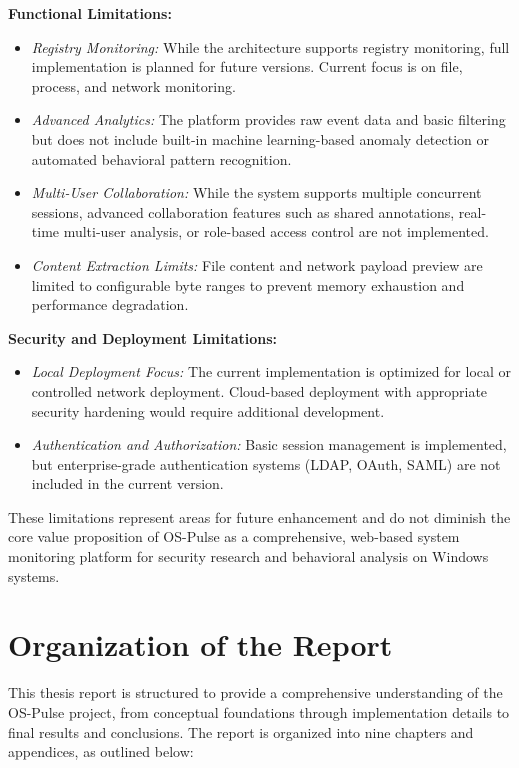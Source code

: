 \textbf{Functional Limitations:}
\begin{itemize}
    \item \textit{Registry Monitoring:} While the architecture supports registry monitoring, full implementation is planned for future versions. Current focus is on file, process, and network monitoring.
    
    \item \textit{Advanced Analytics:} The platform provides raw event data and basic filtering but does not include built-in machine learning-based anomaly detection or automated behavioral pattern recognition.
    
    \item \textit{Multi-User Collaboration:} While the system supports multiple concurrent sessions, advanced collaboration features such as shared annotations, real-time multi-user analysis, or role-based access control are not implemented.
    
    \item \textit{Content Extraction Limits:} File content and network payload preview are limited to configurable byte ranges to prevent memory exhaustion and performance degradation.
\end{itemize}

\textbf{Security and Deployment Limitations:}
\begin{itemize}
    \item \textit{Local Deployment Focus:} The current implementation is optimized for local or controlled network deployment. Cloud-based deployment with appropriate security hardening would require additional development.
    
    \item \textit{Authentication and Authorization:} Basic session management is implemented, but enterprise-grade authentication systems (LDAP, OAuth, SAML) are not included in the current version.
\end{itemize}

These limitations represent areas for future enhancement and do not diminish the core value proposition of OS-Pulse as a comprehensive, web-based system monitoring platform for security research and behavioral analysis on Windows systems.

\section{Organization of the Report}

This thesis report is structured to provide a comprehensive understanding of the OS-Pulse project, from conceptual foundations through implementation details to final results and conclusions. The report is organized into nine chapters and appendices, as outlined below:

